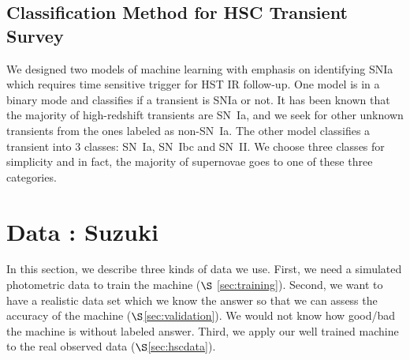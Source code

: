 \documentclass[useamsfonts]{pasj01}
\begin{document}
\subsection{Classification Method for HSC Transient Survey}
We designed two models of machine learning with emphasis on identifying SNIa which requires time sensitive trigger for HST IR follow-up.  One model is in a binary mode and classifies if a transient is SNIa or not.
It has been known that the majority of high-redshift transients are SN~Ia, and we seek for other unknown transients
from the ones labeled as non-SN~Ia.   
The other model classifies a transient into 3 classes: SN~Ia, SN~Ibc and SN~II.  
We choose three classes for simplicity and in fact, the majority of supernovae goes to one of these three categories.
%
%
%
%
%
%
\section{Data : Suzuki}
In this section, we describe three kinds of data we use.
First, we need a simulated photometric data to train the machine ($\S$ \ref{sec:training}).
Second, we want to have a realistic data set which we know the answer so that we can assess the
accuracy of the machine ($\S$\ref{sec:validation}).  We would not know how good/bad the machine 
is without labeled answer.
Third, we apply our well trained machine to the real observed data ($\S$\ref{sec:hscdata}).

\end{document}
